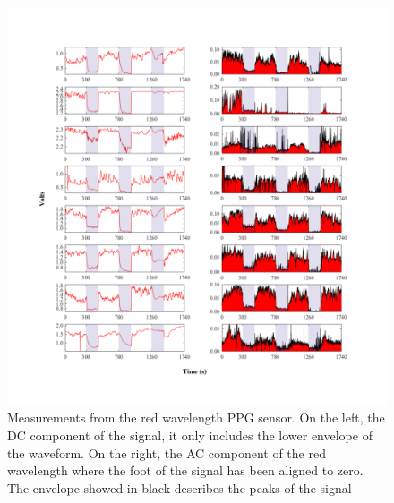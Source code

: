 \begin{figure}[!htbp]
	\centering
	\includegraphics[width=\textwidth,keepaspectratio,trim={1cm 0cm 0cm 0 cm},clip]{figure18}    
	\caption[PPG red wavelength measurments AC and DC components]{Measurements from the red wavelength PPG sensor. On the left, the DC component of the signal, it only includes the lower envelope of the waveform. On the right, the AC component of the red wavelength where the foot of the signal has been aligned to zero. The envelope showed in black describes the peaks of the signal}
	\label{fig:RED_PPG}
\end{figure}

